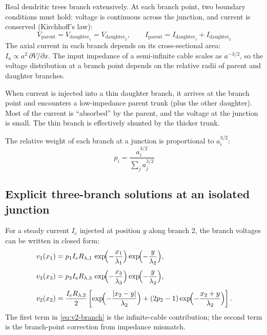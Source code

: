 Real dendritic trees branch extensively. At each branch point, two boundary conditions must hold: voltage is continuous across the junction, and current is conserved (Kirchhoff's law):
%
\begin{equation}
  V_{\text{parent}} = V_{\text{daughter}_1} = V_{\text{daughter}_2}, \qquad
  I_{\text{parent}} = I_{\text{daughter}_1} + I_{\text{daughter}_2}
  \label{eq:branch-bc}
\end{equation}
%
The axial current in each branch depends on its cross-sectional area: $I_a \propto a^2\,\partial V/\partial x$. The input impedance of a semi-infinite cable scales as $a^{-3/2}$, so the voltage distribution at a branch point depends on the relative radii of parent and daughter branches.

When current is injected into a thin daughter branch, it arrives at the branch point and encounters a low-impedance parent trunk (plus the other daughter). Most of the current is ``absorbed'' by the parent, and the voltage at the junction is small. The thin branch is effectively shunted by the thicker trunk.

The relative weight of each branch at a junction is proportional to $a_i^{3/2}$:
%
\begin{equation}
  p_i = \frac{a_i^{3/2}}{\sum_j a_j^{3/2}}
  \label{eq:branch-weights}
\end{equation}

\subsection{Explicit three-branch solutions at an isolated junction}

For a steady current $I_e$ injected at position $y$ along branch 2, the branch voltages can be written in closed form:
%
\begin{align}
  v_1(x_1) &= p_1 I_e R_{\lambda,1}\,
  \exp\!\Bigl(-\frac{x_1}{\lambda_1}\Bigr)
  \exp\!\Bigl(-\frac{y}{\lambda_2}\Bigr), \label{eq:v1-branch} \\[4pt]
  v_3(x_3) &= p_3 I_e R_{\lambda,3}\,
  \exp\!\Bigl(-\frac{x_3}{\lambda_3}\Bigr)
  \exp\!\Bigl(-\frac{y}{\lambda_2}\Bigr), \label{eq:v3-branch} \\[4pt]
  v_2(x_2) &= \frac{I_e R_{\lambda,2}}{2}
  \left[
    \exp\!\Bigl(-\frac{|x_2-y|}{\lambda_2}\Bigr)
    + (2p_2-1)\exp\!\Bigl(-\frac{x_2+y}{\lambda_2}\Bigr)
  \right]. \label{eq:v2-branch}
\end{align}
%
The first term in \cref{eq:v2-branch} is the infinite-cable contribution; the second term is the branch-point correction from impedance mismatch.

